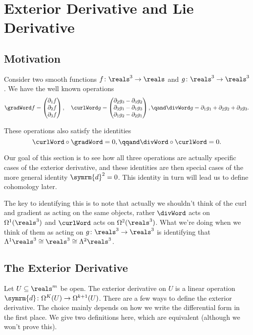 \documentclass[fleqn]{NotesClass}
\renewcommand{\dl}{\symrm{d}}
\newcommand{\isomorphic}{\cong}
\begin{document}
    \section{Exterior Derivative and Lie Derivative}
    \subsection{Motivation}
    Consider two smooth functions \(f \colon \reals^3 \to \reals\) and \(g \colon \reals^3 \to \reals^3\).
    We have the well known operations
    \begin{equation*}
        \gradWord f =
        \begin{pmatrix}
            \partial_1 f\\ \partial_2 f\\ \partial_3 f
        \end{pmatrix}
        , \quad \curlWord g = 
        \begin{pmatrix}
            \partial_2 g_3 - \partial_3 g_2\\
            \partial_3 g_1 - \partial_1 g_3\\
            \partial_1 g_2 - \partial_2 g_1
        \end{pmatrix}
        , \qand \divWord g = \partial_1 g_1 + \partial_2 g_2 + \partial_3 g_3.
    \end{equation*}
    
    These operations also satisfy the identities
    \begin{equation}
        \curlWord \circ \gradWord = 0, \qqand \divWord \circ \curlWord = 0.
    \end{equation}
    
    Our goal of this section is to see how all three operations are actually specific cases of the exterior derivative, and these identities are then special cases of the more general identity \(\dl^2 = 0\).
    This identity in turn will lead us to define cohomology later.
    
    The key to identifying this is to note that actually we shouldn't think of the curl and gradient as acting on the same objects, rather \(\divWord\) acts on \(\Omega^1(\reals^3)\) and \(\curlWord\) acts on \(\Omega^2(\reals^3)\).
    What we're doing when we think of them as acting on \(g \colon \reals^3 \to \reals^3\) is identifying that \(\Lambda^1\reals^3 \isomorphic \reals^3 \isomorphic \Lambda^2\reals^3\).
    
    \subsection{The Exterior Derivative}
    Let \(U \subseteq \reals^m\) be open.
    The exterior derivative on \(U\) is a linear operation \(\dl \colon \Omega^K(U) \to \Omega^{k+1}(U)\).
    There are a few ways to define the exterior derivative.
    The choice mainly depends on how we write the differential form in the first place.
    We give two definitions here, which are equivalent (although we won't prove this).
    
\end{document}
